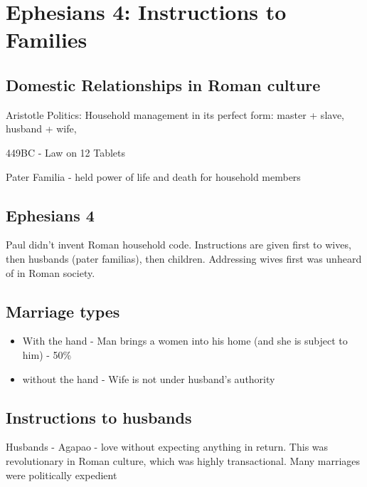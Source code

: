 \documentclass[
]{book}
\providecommand{\tightlist}{%
  \setlength{\itemsep}{0pt}\setlength{\parskip}{0pt}}
\begin{document}
\hypertarget{ephesians-4-instructions-to-families}{%
\section{Ephesians 4: Instructions to Families}\label{ephesians-4-instructions-to-families}}

\hypertarget{domestic-relationships-in-roman-culture}{%
\subsection{Domestic Relationships in Roman culture}\label{domestic-relationships-in-roman-culture}}

Aristotle Politics: Household management in its perfect form: master + slave, husband + wife,

449BC - Law on 12 Tablets

Pater Familia - held power of life and death for household members

\hypertarget{ephesians-4}{%
\subsection{Ephesians 4}\label{ephesians-4}}

Paul didn't invent Roman household code. Instructions are given first to wives, then husbands (pater familias), then children. Addressing wives first was unheard of in Roman society.

\hypertarget{marriage-types}{%
\subsection{Marriage types}\label{marriage-types}}

\begin{itemize}
\tightlist
\item
  With the hand - Man brings a women into his home (and she is subject to him) - 50\%
\item
  without the hand - Wife is not under husband's authority
\end{itemize}

\hypertarget{instructions-to-husbands}{%
\subsection{Instructions to husbands}\label{instructions-to-husbands}}

Husbands - Agapao - love without expecting anything in return. This was revolutionary in Roman culture, which was highly transactional. Many marriages were politically expedient
\end{document}

